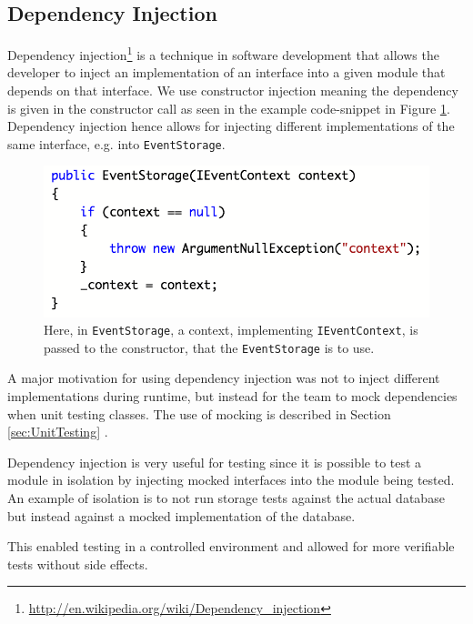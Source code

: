 \subsection{Dependency Injection}
Dependency injection\footnote{\url{http://en.wikipedia.org/wiki/Dependency_injection}} is a technique in software development that allows the developer to inject an implementation of an interface into a given module that depends on that interface. We use constructor injection meaning the dependency is given in the constructor call as seen in the example code-snippet in Figure \ref{fig:DependencyInjection}. Dependency injection hence allows for injecting different implementations of the same interface, e.g. into \texttt{EventStorage}.

\begin{figure}[h!]
\centering
\includegraphics[width=0.7\linewidth]{figures/EventStorage1}
\caption{\label{fig:DependencyInjection}Here, in \texttt{EventStorage}, a context, implementing \texttt{IEventContext}, is passed to the constructor, that the \texttt{EventStorage} is to use.  }
\end{figure}

A major motivation for using dependency injection was not to inject different implementations during runtime, but instead for the team to mock dependencies when unit testing classes. The use of mocking is described in Section \ref{sec:UnitTesting} .

Dependency injection is very useful for testing since it is possible to test a module in isolation by injecting mocked interfaces into the module being tested. An example of isolation is to not run storage tests against the actual database but instead against a mocked implementation of the database. 

This enabled testing in a controlled environment and allowed for more verifiable tests without side effects.